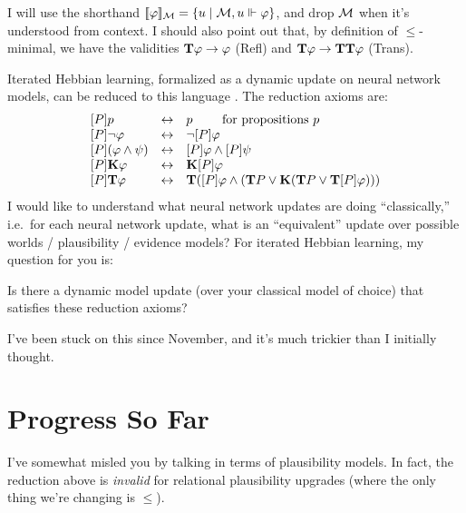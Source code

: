 \documentclass[letterpaper]{article}
\begin{document}
I will use the shorthand $[\![\mbox{\em $ \varphi $\/}]\!]_{\mathcal{M}} =   \{ u \mid \mathcal{M}, u \Vdash \varphi \}$, and drop $\mathcal{M}$ when it's understood from context.  I should also point out that, by definition of $\leq$-minimal, we have the validities $\textrm{\textup{\textbf{T}}} \varphi \to \varphi$ (Refl) and $\textrm{\textup{\textbf{T}}}  \varphi \to \textrm{\textup{\textbf{T}}} \textrm{\textup{\textbf{T}}} \varphi$ (Trans).

Iterated Hebbian learning, formalized as a dynamic update on neural network models, can be reduced to this language \cite{kisby2024hebbian}.  The reduction axioms are:
\[
    \begin{array}{lcll}
        \Hebbop{P} p & \leftrightarrow & p \quad \quad \mbox{ for propositions } p \\
        \Hebbop{P} \neg \varphi & \leftrightarrow & \neg \Hebbop{P} \varphi\\
        \Hebbop{P} (\varphi \land \psi) & \leftrightarrow & \Hebbop{P} \varphi \land \Hebbop{P} \psi \\
        \Hebbop{P} \Know{\varphi} & \leftrightarrow & \Know{\Hebbop{P} \varphi}\\
        
        \Hebbop{P} \Typ{\varphi} & \leftrightarrow & 
        \Typ{(\Hebbop{P}\varphi \land (\Typ{P \lor \Know{(\Typ{P} \lor \Typ{\Hebbop{P}\varphi})}}))}
    \end{array}
\]
I would like to understand what neural network updates are doing ``classically,'' i.e.\ for each neural network update, what is an ``equivalent'' update over possible worlds / plausibility / evidence models?  For iterated Hebbian learning, my question for you is:
\begin{question}
    Is there a dynamic model update (over your classical model of choice) that satisfies these reduction axioms?
\end{question}
I've been stuck on this since November, and it's much trickier than I initially thought.

\section*{Progress So Far}

I've somewhat misled you by talking in terms of plausibility models.  In fact, the reduction above is \emph{invalid} for relational plausibility upgrades (where the only thing we're changing is $\leq$).
\end{document}
